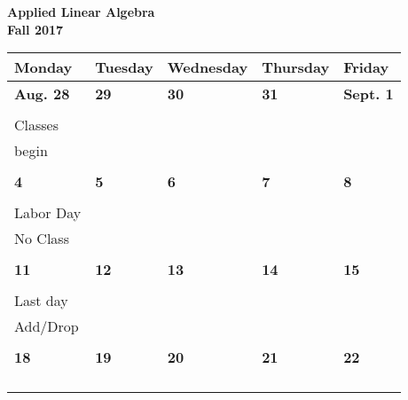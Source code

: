 \documentclass[letter, 12pt]{article}
\begin{document}
\begin{center}\textbf{Applied Linear Algebra}\\
\textbf{Fall 2017}
\end{center}
\begin{center}
\begin{tabular}{|l|l|l|l|l|}
\hline

{\bf \phantom{xx}Monday\phantom{x}}
 & {\bf \phantom{xx}Tuesday\phantom{x}}
 & {\bf \phantom{x}Wednesday\phantom{}}
 & {\bf \phantom{x}Thursday\phantom{x}}
 & {\bf \phantom{xx}Friday\phantom{xx}} \\
\hline


\textbf{Aug. 28} & \textbf{29} & \textbf{30} & \textbf{31} & \textbf{Sept. 1} \\
&  &  &  & \\
%
{\small Classes}&  &  &  & \\
%
{\small begin}&  &  &  & \\
%
&  &  &  & \\
\hline


\textbf{4} & \textbf{5} & \textbf{6} & \textbf{7} & \textbf{8} \\
&  &  &  & \\
%
{\small Labor Day}&  &  &  & \\
%
{\small No Class}&  &  &  & \\
%
&  &  &  & \\
\hline



\textbf{11} & \textbf{12} & \textbf{13} & \textbf{14} & \textbf{15} \\
&  &  &  & \\
%
{\small Last day}&  &  &  & \\
%
{\small Add/Drop}&  &  &  & \\
%
&  &  &  & \\
\hline



\textbf{18} & \textbf{19} & \textbf{20} & \textbf{21} & \textbf{22} \\
&  &  &  & \\
%
&  &  &  & \\
%
&  &  &  & \\
%
&  &  &  & \\
\hline



\end{tabular}
\end{center}
\end{document}
